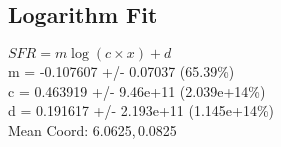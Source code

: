 \documentclass{article}
\begin{document}
		\subsection{Logarithm Fit}
		\begin{minipage}[h]{0.6\textwidth}
				\begin{center}
					\begingroup{}
		  			\resizebox{\textwidth}{!}{%
						
		  			}\endgroup
				\end{center}
		\end{minipage}
		\begin{minipage}[h]{0.35\textwidth}
			$SFR = m\log(c\times x) + d$ \\
			m               = -0.107607        +/- 0.07037      (65.39\%) \\
			c               = 0.463919         +/- 9.46e+11     (2.039e+14\%) \\
			d               = 0.191617         +/- 2.193e+11    (1.145e+14\%) \\

			Mean Coord: 6.0625,\,0.0825
		\end{minipage}
\end{document}

